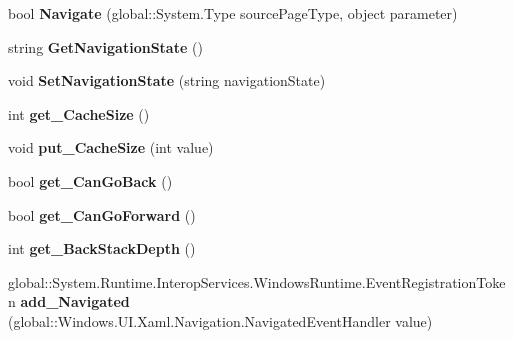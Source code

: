 \begin{DoxyCompactItemize}
bool {\bfseries Navigate} (global\+::\+System.\+Type source\+Page\+Type, object parameter)
\item 
\mbox{\label{interface_windows_1_1_u_i_1_1_xaml_1_1_controls_1_1_i_frame_a5fae043ba619aec40326928f7c8f0708}} 
string {\bfseries Get\+Navigation\+State} ()
\item 
\mbox{\label{interface_windows_1_1_u_i_1_1_xaml_1_1_controls_1_1_i_frame_abca9cc6c6c9ab20f0837c2d3734275f1}} 
void {\bfseries Set\+Navigation\+State} (string navigation\+State)
\item 
\mbox{\label{interface_windows_1_1_u_i_1_1_xaml_1_1_controls_1_1_i_frame_a928bc8fe265cccd51999efbf6dc79625}} 
int {\bfseries get\+\_\+\+Cache\+Size} ()
\item 
\mbox{\label{interface_windows_1_1_u_i_1_1_xaml_1_1_controls_1_1_i_frame_a090d2a89af30c25a8ade9df9f28d63a2}} 
void {\bfseries put\+\_\+\+Cache\+Size} (int value)
\item 
\mbox{\label{interface_windows_1_1_u_i_1_1_xaml_1_1_controls_1_1_i_frame_a31e423bda3f37c6c68a64e9a2c3cfc96}} 
bool {\bfseries get\+\_\+\+Can\+Go\+Back} ()
\item 
\mbox{\label{interface_windows_1_1_u_i_1_1_xaml_1_1_controls_1_1_i_frame_a346c7bc9a558e30d8c23493675ea1f25}} 
bool {\bfseries get\+\_\+\+Can\+Go\+Forward} ()
\item 
\mbox{\label{interface_windows_1_1_u_i_1_1_xaml_1_1_controls_1_1_i_frame_ac4b8a2575628ea785683c53acd9f9404}} 
int {\bfseries get\+\_\+\+Back\+Stack\+Depth} ()
\item 
\mbox{\label{interface_windows_1_1_u_i_1_1_xaml_1_1_controls_1_1_i_frame_a624be18e7822eb17b5b16a420e0721bc}} 
global\+::\+System.\+Runtime.\+Interop\+Services.\+Windows\+Runtime.\+Event\+Registration\+Token {\bfseries add\+\_\+\+Navigated} (global\+::\+Windows.\+U\+I.\+Xaml.\+Navigation.\+Navigated\+Event\+Handler value)

\end{DoxyCompactItemize}
